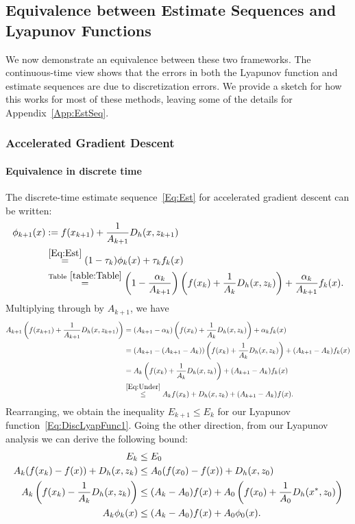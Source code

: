 \documentclass[11pt]{article}
\theoremstyle{plain}
\begin{document}
\subsection{Equivalence between Estimate Sequences and Lyapunov Functions}
We now demonstrate an equivalence between these two frameworks.  The continuous-time view shows that the errors in both the Lyapunov function and estimate sequences are due to discretization errors. We provide a sketch for how this works for most of these methods, leaving some of the details for Appendix~\ref{App:EstSeq}.
\subsubsection{Accelerated Gradient Descent}
\paragraph{Equivalence in discrete time}
The discrete-time estimate sequence~\eqref{Eq:Est} for accelerated gradient descent can be written:
\begin{align*}
\phi_{k+1}(x) &:= f(x_{k+1}) + \frac{1}{A_{k+1}}D_h(x, z_{k+1}) \\
& \overset{\eqref{Eq:Est}}{=} (1 - \tau_k) \phi_k(x)  + \tau_k f_k(x) \\
&\overset{\text{Table}~\ref{table:Table}}{=} \left(1 - \frac{\alpha_k}{A_{k+1}} \right)\left(f(x_k) +\frac{1}{A_k} D_h(x, z_k)\right) + \frac{\alpha_k}{A_{k+1}} f_k(x).
\end{align*}
Multiplying through by $A_{k+1}$, we have
\begin{align*}
A_{k+1} \left(f(x_{k+1}) + \frac{1}{A_{k+1}}D_h(x, z_{k+1})\right) &= (A_{k+1} - \alpha_k) \left(f(x_k) + \frac{1}{A_k}D_h(x, z_k)\right) + \alpha_k f_k(x)\\
&= (A_{k+1} - (A_{k+1} - A_k)) \left(f(x_k) + \frac{1}{A_k}D_h(x, z_k)\right) + (A_{k+1} - A_k) f_k(x)\\
&=  A_k \left(f(x_k) + \frac{1}{A_k}D_h(x, z_k) \right) + (A_{k+1} - A_k) f_k(x)\\
& \overset{\eqref{Eq:Under}}{\leq}  A_k f(x_k) + D_h(x, z_k)+ (A_{k+1} - A_k) f(x).
\end{align*}
Rearranging, we obtain the inequality $E_{k+1} \leq E_k$ for our Lyapunov function~\eqref{Eq:DiscLyapFunc1}. 
%
%
%
Going the other direction, from our Lyapunov analysis we can derive the following bound:
\begin{subequations}\label{Eq:EstSeqErr}
\begin{align}
E_k &\leq E_0\\
A_{k}(f(x_{k}) - f(x)) + D_h(x, z_{k}) &\leq A_0 (f(x_0) - f(x)) + D_h(x, z_0) \notag\\
A_{k}\left(f(x_{k}) - \frac{1}{A_{k}}D_h(x, z_{k})\right) &\leq (A_k -  A_0) f(x) + A_0\left(f(x_0)+ \frac{1}{A_0}  D_h(x^\ast, z_0)\right) \notag \\
A_k \phi_k(x) &\leq (A_k -A_0) f(x) + A_0 \phi_0(x). \label{Eq:EstSeq}
\end{align}
\end{subequations}
\end{document}
